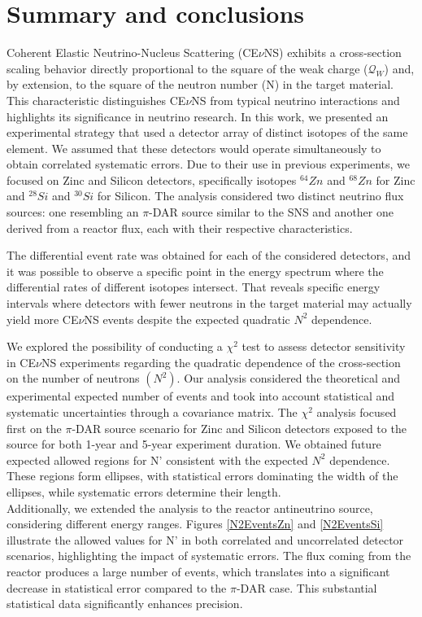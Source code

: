 \chapter{Summary and conclusions}\label{cap:conclusiones}

Coherent Elastic Neutrino-Nucleus Scattering (CE$\nu$NS) exhibits a cross-section scaling behavior directly proportional to the square of the weak charge ($\mathcal{Q}_W$) and, by extension, to the square of the neutron number (N) in the target material. This characteristic distinguishes CE$\nu$NS from typical neutrino interactions and highlights its significance in neutrino research. In this work, we presented an experimental strategy that used a detector array of distinct isotopes of the same element. We assumed that these detectors would operate simultaneously to obtain correlated systematic errors.
Due to their use in previous experiments, we focused on Zinc and Silicon detectors, specifically isotopes $^{64}Zn$ and $^{68}Zn$ for Zinc and $^{28}Si$ and $^{30}Si$ for Silicon. The analysis considered two distinct neutrino flux sources: one resembling an $\pi$-DAR source similar to the SNS and another one derived from a reactor flux, each with their respective characteristics. 


The differential event rate was obtained for each of the considered detectors, and it was possible to observe a specific point in the energy spectrum where the differential rates of different isotopes intersect. That reveals specific energy intervals where detectors with fewer neutrons in the target material may actually yield more CE$\nu$NS events despite the expected quadratic $N^2$ dependence. 

We explored the possibility of conducting a $\chi^2$ test to assess detector sensitivity in  CE$\nu$NS experiments regarding the quadratic dependence of the cross-section on the number of neutrons $\left(N^2\right)$. Our analysis considered the theoretical and experimental expected number of events and took into account statistical and systematic uncertainties through a covariance matrix. The $\chi^2$ analysis focused first on the $\pi$-DAR source scenario for Zinc and Silicon detectors exposed to the source for both 1-year and 5-year experiment duration. We obtained future expected allowed regions for N' consistent with the expected $N^2$ dependence. These regions form ellipses, with statistical errors dominating the width of the ellipses, while systematic errors determine their length. \\
Additionally, we extended the analysis to the reactor antineutrino source, considering different energy ranges. Figures \ref{N2EventsZn} and \ref{N2EventsSi} illustrate the allowed values for N' in both correlated and uncorrelated detector scenarios, highlighting the impact of systematic errors. The flux coming from the reactor produces a large number of events, which translates into a significant decrease in statistical error compared to the $\pi$-DAR case. This substantial statistical data significantly enhances precision. 

